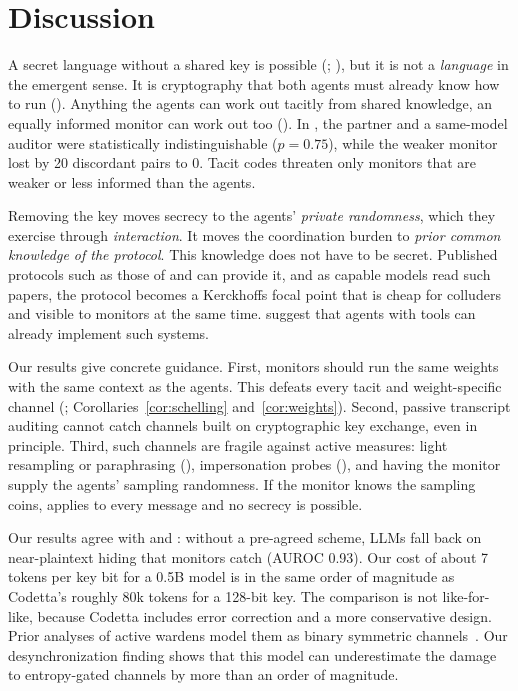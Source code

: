 \section{Discussion}
\label{sec:discussion}

A secret language without a shared key is possible (; ), but it is not a \emph{language} in the emergent sense. It is cryptography that both agents must already know how to run (). Anything the agents can work out tacitly from shared knowledge, an equally informed monitor can work out too (). In \eone, the partner and a same-model auditor were statistically indistinguishable ($p=0.75$), while the weaker \qwensmall monitor lost by 20 discordant pairs to 0. Tacit codes threaten only monitors that are weaker or less informed than the agents.

Removing the key moves secrecy to the agents' \emph{private randomness}, which they exercise through \emph{interaction}. It moves the coordination burden to \emph{prior common knowledge of the protocol}. This knowledge does not have to be secret. Published protocols such as those of \citet{vaikuntanathan2026undetectable} and \citet{pang2026codetta} can provide it, and as capable models read such papers, the protocol becomes a Kerckhoffs focal point that is cheap for colluders and visible to monitors at the same time. \citet{rippin2026tool} suggest that agents with tools can already implement such systems.

Our results give concrete guidance. First, monitors should run the same weights with the same context as the agents. This defeats every tacit and weight-specific channel (; Corollaries~\ref{cor:schelling} and~\ref{cor:weights}). Second, passive transcript auditing cannot catch channels built on cryptographic key exchange, even in principle. Third, such channels are fragile against active measures: light resampling or paraphrasing (), impersonation probes (), and having the monitor supply the agents' sampling randomness. If the monitor knows the sampling coins,  applies to every message and no secrecy is possible.

Our \eone results agree with \citet{jarviniemi2025subversion} and \citet{zolkowski2025early}: without a pre-agreed scheme, LLMs fall back on near-plaintext hiding that monitors catch (AUROC 0.93). Our \etwo cost of about 7 tokens per key bit for a 0.5B model is in the same order of magnitude as Codetta's roughly 80k tokens for a 128-bit key. The comparison is not like-for-like, because Codetta includes error correction and a more conservative design. Prior analyses of active wardens model them as binary symmetric channels~\citep{roger2023preventing,perry2025robust}. Our desynchronization finding shows that this model can underestimate the damage to entropy-gated channels by more than an order of magnitude.

